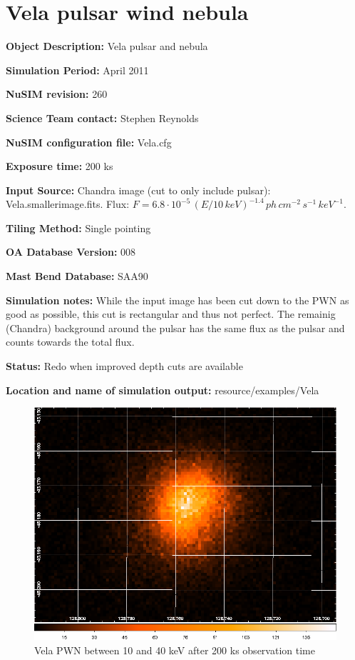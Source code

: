 
\newpage

\section{Vela pulsar wind nebula}

\textbf{Object Description:} Vela pulsar and nebula

\textbf{Simulation Period:} April 2011

\textbf{NuSIM revision:} 260

\textbf{Science Team contact:} Stephen Reynolds

\textbf{NuSIM configuration file:} Vela.cfg

\textbf{Exposure time:} 200 ks

\textbf{Input Source:} 
Chandra image (cut to only include pulsar): Vela.smallerimage.fits.
Flux: $F = 6.8\cdot10^{-5}\,(E/10\,keV)^{-1.4}\,ph\,cm^{-2}\,s^{-1}\,keV^{-1}$.

\textbf{Tiling Method:} Single pointing

\textbf{OA Database Version:} 008

\textbf{Mast Bend Database:} SAA90

\textbf{Simulation notes:} While the input image has been cut down to the PWN as good as possible, this cut is rectangular and thus not perfect. The remainig (Chandra) background around the pulsar has the same flux as the pulsar and counts towards the total flux.

\textbf{Status:} 
Redo when improved depth cuts are available

\textbf{Location and name of simulation output:} resource/examples/Vela

\begin{figure}[h]
\begin{center}
\includegraphics[width=14cm]{Vela/Vela.png}
\caption{Vela PWN between 10 and 40 keV after 200 ks observation time}
\label{Vela} 
\end{center}
\end{figure}

